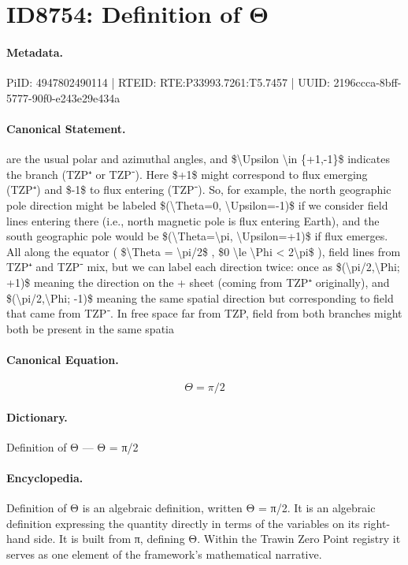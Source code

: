 \section*{ID8754: Definition of Θ}
\paragraph{Metadata.}
PiID: 4947802490114 | RTEID: RTE:P33993.7261:T5.7457 | UUID: 2196ccca-8bff-5777-90f0-e243e29e434a

\paragraph{Canonical Statement.}
are the usual polar and azimuthal angles, and \$\textbackslash{}Upsilon \textbackslash{}in \{+1,-1\}\$ indicates the branch (TZP⁺ or TZP⁻). Here \$+1\$ might correspond to flux emerging (TZP⁺) and \$-1\$ to flux entering (TZP⁻). So, for example, the north geographic pole direction might be labeled \$(\textbackslash{}Theta=0, \textbackslash{}Upsilon=-1)\$ if we consider field lines entering there (i.e., north magnetic pole is flux entering Earth), and the south geographic pole would be \$(\textbackslash{}Theta=\textbackslash{}pi, \textbackslash{}Upsilon=+1)\$ if flux emerges. All along the equator ( \$\textbackslash{}Theta = \textbackslash{}pi/2\$ , \$0 \textbackslash{}le \textbackslash{}Phi < 2\textbackslash{}pi\$ ), field lines from TZP⁺ and TZP⁻ mix, but we can label each direction twice: once as \$(\textbackslash{}pi/2,\textbackslash{}Phi; +1)\$ meaning the direction on the + sheet (coming from TZP⁺ originally), and \$(\textbackslash{}pi/2,\textbackslash{}Phi; -1)\$ meaning the same spatial direction but corresponding to field that came from TZP⁻. In free space far from TZP, field from both branches might both be present in the same spatia

\paragraph{Canonical Equation.}
\[
\Theta = \pi/2
\]

\paragraph{Dictionary.}
Definition of Θ — Θ = π/2

\paragraph{Encyclopedia.}
Definition of Θ is an algebraic definition, written Θ = π/2. It is an algebraic definition expressing the quantity directly in terms of the variables on its right-hand side. It is built from π, defining Θ. Within the Trawin Zero Point registry it serves as one element of the framework's mathematical narrative.
